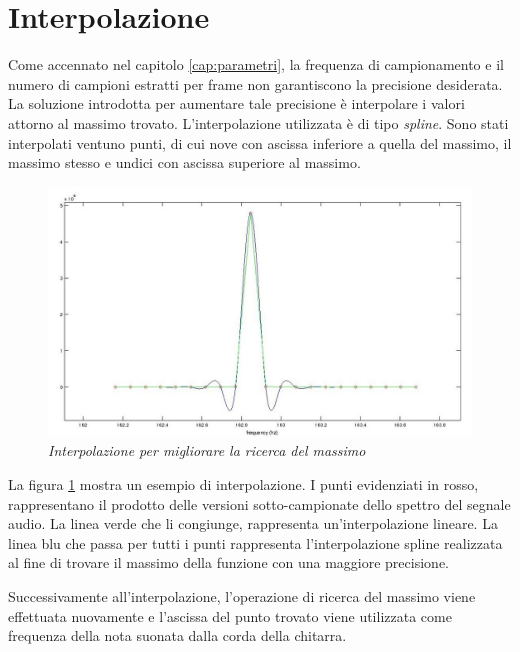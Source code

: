 \chapter*{Interpolazione}\label{cap:interpolazione}

Come accennato nel capitolo \ref{cap:parametri}, la frequenza di campionamento e il numero di campioni estratti per frame non garantiscono la precisione desiderata.
La soluzione introdotta per aumentare tale precisione è interpolare i valori attorno al massimo trovato.
L'interpolazione utilizzata è di tipo \emph{spline}.
Sono stati interpolati ventuno punti, di cui nove con ascissa inferiore a quella del massimo, il massimo stesso e undici con ascissa superiore al massimo.

	\begin{figure}[h]
	  \begin{center} 
	    \includegraphics[width=\textwidth*\real{0.9}]{images/ch_05/interpolazione.jpg}
	  \end{center} 
	  \caption{\textit{Interpolazione per migliorare la ricerca del massimo}}  
	  \label{fig:interpolazione}
	\end{figure}

La figura \ref{fig:interpolazione} mostra un esempio di interpolazione. 
I punti evidenziati in rosso, rappresentano il prodotto delle versioni sotto-campionate dello spettro del segnale audio.
La linea verde che li congiunge, rappresenta un'interpolazione lineare.
La linea blu che passa per tutti i punti rappresenta l'interpolazione spline realizzata al fine di trovare il massimo della funzione con una maggiore precisione.

Successivamente all'interpolazione, l'operazione di ricerca del massimo viene effettuata nuovamente e l'ascissa del punto trovato viene utilizzata come frequenza della nota suonata dalla corda della chitarra.
